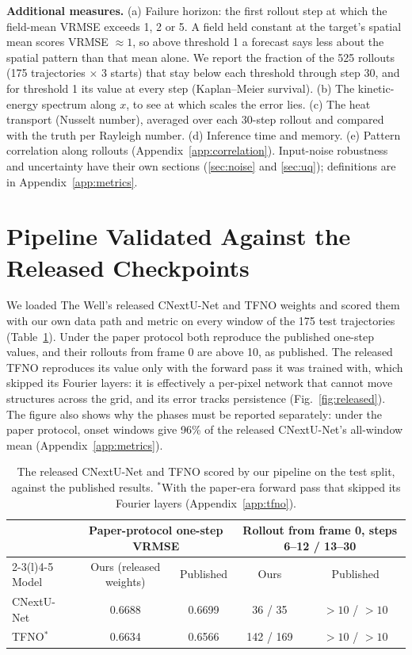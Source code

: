 \documentclass[11pt]{article}
\begin{document}
\textbf{Additional measures.} (a) Failure horizon: the first rollout step at which the field-mean VRMSE exceeds 1, 2
or 5. A field held constant at the target's spatial mean scores VRMSE $\approx 1$, so above threshold 1 a forecast
says less about the spatial pattern than that mean alone. We report the fraction of the 525 rollouts (175
trajectories $\times$ 3 starts) that stay below each threshold through step 30, and for threshold 1 its value at every
step (Kaplan--Meier survival). (b) The kinetic-energy spectrum along $x$, to see at which scales the error lies.
(c) The heat transport (Nusselt number), averaged over each 30-step rollout and compared with the truth per Rayleigh
number. (d) Inference time and memory. (e) Pattern correlation along rollouts
(Appendix~\ref{app:correlation}). Input-noise robustness and uncertainty have their own sections
(\ref{sec:noise} and \ref{sec:uq}); definitions are in Appendix~\ref{app:metrics}.

\section{Pipeline Validated Against the Released Checkpoints}
\label{sec:m1}

We loaded The Well's released CNextU-Net and TFNO weights and scored them with our own data path and metric on
every window of the 175 test trajectories (Table~\ref{tab:released}). Under the paper protocol both reproduce the
published one-step values, and their rollouts from frame 0 are above 10, as published. The released TFNO reproduces
its value only with the forward pass it was trained with, which skipped its Fourier layers: it is effectively a
per-pixel network that cannot move structures across the grid, and its error tracks persistence
(Fig.~\ref{fig:released}). The figure also shows why the phases must be reported separately: under the paper
protocol, onset windows give 96\% of the released CNextU-Net's all-window mean (Appendix~\ref{app:metrics}).

\begin{table}[tp]
\centering\small
\begin{tabular}{@{}lcccc@{}}
\toprule
& \multicolumn{2}{c}{Paper-protocol one-step VRMSE} & \multicolumn{2}{c}{Rollout from frame 0, steps 6--12 / 13--30} \\
\cmidrule(lr){2-3}\cmidrule(l){4-5}
Model & Ours (released weights) & Published & Ours & Published \\
\midrule
CNextU-Net & 0.6688 & 0.6699 & 36 / 35 & $>10$ / $>10$ \\
TFNO$^{*}$ & 0.6634 & 0.6566 & 142 / 169 & $>10$ / $>10$ \\
\bottomrule
\end{tabular}
\caption{The released CNextU-Net and TFNO scored by our pipeline on the test split, against the published results.
$^{*}$With the paper-era forward pass that skipped its Fourier layers (Appendix~\ref{app:tfno}).}
\label{tab:released}
\end{table}
\end{document}
